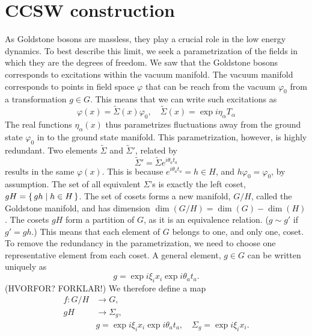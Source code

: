 \section{CCSW construction}

As Goldstone bosons are massless, they play a crucial role in the low energy dynamics.
To best describe this limit, we seek a parametrization of the fields in which they are the degrees of freedom.
We saw that the Goldstone bosons corresponds to excitations within the vacuum manifold.
The vacuum manifold corresponds to points in field space $\varphi$ that can be reach from the vacuum $\varphi_0$ from a transformation $g \in G$.
This means that we can write such excitations as
\begin{equation}
    \varphi(x) = \tilde\Sigma(x) \varphi_0, \quad \tilde \Sigma(x) = \exp{i \eta_\alpha T_\alpha}
\end{equation}
The real functions $\eta_\alpha(x)$ thus parametrizes fluctuations away from the ground state $\varphi_0$ in to the ground state manifold.
This parametrization, however, is highly redundant.
Two elements $\tilde\Sigma$ and $\tilde\Sigma'$, related by 
\begin{equation}
    \tilde \Sigma' = \tilde\Sigma e^{i \theta_a t_a}
\end{equation}
results in the same $\varphi(x)$.
This is because  $e^{i \theta_a t_a} = h \in H$, and $h \varphi_0 = \varphi_0$, by assumption.
The set of all equivalent $\Sigma$'s is exactly the left coset, $gH = \left\{\, gh \mid  h \in H \,\right\}$.
The set of cosets forms a new manifold, $G / H$, called the Goldstone manifold, and has dimension $\dim(G/H) = \dim(G) - \dim(H)$.
The cosets $gH$ form a partition of $G$, as it is an equivalence relation. ($g \sim g'$ if $g' = gh$.)
This means that each element of $G$ belongs to one, and only one, coset.
To remove the redundancy in the parametrization, we need to choose one representative element from each coset.
A general element, $g \in G$ can be written uniquely as
\begin{equation}
    g = \exp{i \xi_i x_i} \exp{i \theta_a t_a}.
\end{equation}
(HVORFOR? FORKLAR!)
We therefore define a map
\begin{align}
    f: G/H & \longrightarrow G, \\
    gH & \longrightarrow \Sigma_g, \\
    & g = \exp{i \xi_i x_i} \exp{i \theta_a t_a}, \quad \Sigma_g = \exp{i \xi_i x_i}.
\end{align}

